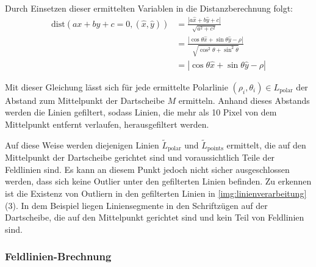 Durch Einsetzen dieser ermittelten Variablen in die Distanzberechnung folgt:
\begin{align*}
    \text{dist}(ax + by + c = 0, (\hat{x}, \hat{y})) & = \frac{| a \hat{x} + b \hat{y} + c|}{\sqrt{a^2+c^2}}                                                   \\
                                                     & = \frac{| \cos{\theta} \hat{x} + \sin{\theta} \hat{y} - \rho |}{\sqrt{\cos^2{\theta} + \sin^2{\theta}}} \\
                                                     & = | \cos{\theta} \hat{x} + \sin{\theta} \hat{y} - \rho |
\end{align*}

Mit dieser Gleichung lässt sich für jede ermittelte Polarlinie $(\rho_i, \theta_i) \in L_\text{polar}$ der Abstand zum Mittelpunkt der Dartscheibe $M$ ermitteln. Anhand dieses Abstands werden die Linien gefiltert, sodass Linien, die mehr als 10 Pixel von dem Mittelpunkt entfernt verlaufen, herausgefiltert werden.

Auf diese Weise werden diejenigen Linien $\widetilde{L}_\text{polar}$ und $\widetilde{L}_\text{points}$ ermittelt, die auf den Mittelpunkt der Dartscheibe gerichtet sind und voraussichtlich Teile der Feldlinien sind. Es kann an diesem Punkt jedoch nicht sicher ausgeschlossen werden, dass sich keine Outlier unter den gefilterten Linien befinden. Zu erkennen ist die Existenz von Outliern in den gefilterten Linien in \autoref{img:linienverarbeitung} (3). In dem Beispiel liegen Liniensegmente in den Schriftzügen auf der Dartscheibe, die auf den Mittelpunkt gerichtet sind und kein Teil von Feldlinien sind.

\subsubsection{Feldlinien-Brechnung}
\label{sec:feldlinien_berechnung}

